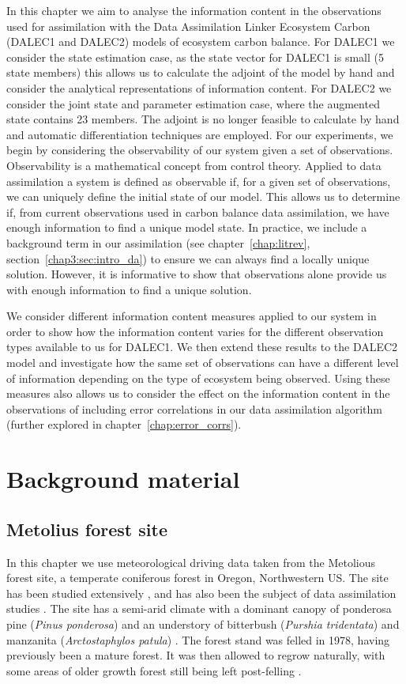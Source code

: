 In this chapter we aim to analyse the information content in the observations used for assimilation with the Data Assimilation Linker Ecosystem Carbon (DALEC1 and DALEC2) models of ecosystem carbon balance. For DALEC1 we consider the state estimation case, as the state vector for DALEC1 is small (5 state members) this allows us to calculate the adjoint of the model by hand and consider the analytical representations of information content. For DALEC2 we consider the joint state and parameter estimation case, where the augmented state contains 23 members. The adjoint is no longer feasible to calculate by hand and automatic differentiation techniques are employed. For our experiments, we begin by considering the observability of our system given a set of observations. Observability is a mathematical concept from control theory. Applied to data assimilation a system is defined as observable if, for a given set of observations, we can uniquely define the initial state of our model. This allows us to determine if, from current observations used in carbon balance data assimilation, we have enough information to find a unique model state. In practice, we include a background term in our assimilation (see chapter~\ref{chap:litrev}, section~\ref{chap3:sec:intro_da}) to ensure we can always find a locally unique solution. However, it is informative to show that observations alone provide us with enough information to find a unique solution.

We consider different information content measures applied to our system in order to show how the information content varies for the different observation types available to us for DALEC1. We then extend these results to the DALEC2 model and investigate how the same set of observations can have a different level of information depending on the type of ecosystem being observed. Using these measures also allows us to consider the effect on the information content in the observations of including error correlations in our data assimilation algorithm (further explored in chapter~\ref{chap:error_corrs}).

\section{Background material}

\subsection{Metolius forest site} \label{chap5:sec:oregon}
In this chapter we use meteorological driving data taken from the Metolious forest site, a temperate coniferous forest in Oregon, Northwestern US. The site has been studied extensively \citep{law2001carbon}, and has also been the subject of data assimilation studies \citep{williams2005improved, Quaife2008}. The site has a semi-arid climate with a dominant canopy of ponderosa pine (\textit{Pinus ponderosa}) and an understory of bitterbush (\textit{Purshia tridentata}) and manzanita (\textit{Arctostaphylos patula}) \citep{law2001estimation}. The forest stand was felled in 1978, having previously been a mature forest. It was then allowed to regrow naturally, with some areas of older growth forest still being left post-felling \citep{williams2005improved}.

